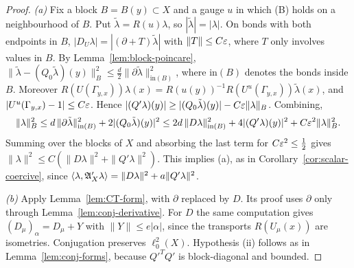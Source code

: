 \begin{proof}
\emph{(a)} Fix a block $B=B(y)\subset X$ and a gauge $u$ in which (B) holds on a neighbourhood of $B$. Put $\tilde\lambda=R(u)\lambda$, so $|\tilde\lambda|=|\lambda|$. On bonds with both endpoints in $B$, $|D_U\lambda|=|(\partial+T)\tilde\lambda|$ with $\|T\|\le C\varepsilon$, where $T$ only involves values in $B$. By Lemma~\ref{lem:block-poincare}, $\|\tilde\lambda-(Q_0\tilde\lambda)(y)\|_B^2\le\frac d2\|\partial\tilde\lambda\|^2_{\mathrm{in}(B)}$, where $\mathrm{in}(B)$ denotes the bonds inside $B$. Moreover $R(U(\Gamma_{y,x}))\lambda(x)=R(u(y))^{-1}R(U^u(\Gamma_{y,x}))\tilde\lambda(x)$, and $|U^u(\Gamma_{y,x})-1|\le C\varepsilon$. Hence $|(Q'\lambda)(y)|\ge|(Q_0\tilde\lambda)(y)|-C\varepsilon\|\lambda\|_B$. Combining,
\[
\|\lambda\|_B^2\le d\,\|\partial\tilde\lambda\|^2_{\mathrm{in}(B)}+2|(Q_0\tilde\lambda)(y)|^2\le2d\,\|D\lambda\|^2_{\mathrm{in}(B)}+4|(Q'\lambda)(y)|^2+C\varepsilon^2\|\lambda\|_B^2 .
\]
Summing over the blocks of $X$ and absorbing the last term for $C\varepsilon^2\le\frac12$ gives $\|\lambda\|^2\le C(\|D\lambda\|^2+\|Q'\lambda\|^2)$. This implies (a), as in Corollary~\ref{cor:scalar-coercive}, since $\langle \lambda,\mathfrak A'_X\lambda\rangle=\|D\lambda\|^2+a\|Q'\lambda\|^2$.

\emph{(b)} Apply Lemma~\ref{lem:CT-form}, with $\partial$ replaced by $D$. Its proof uses $\partial$ only through Lemma~\ref{lem:conj-derivative}. For $D$ the same computation gives $(D_\mu)_\alpha=D_\mu+Y$ with $\|Y\|\le e|\alpha|$, since the transports $R(U_\mu(x))$ are isometries. Conjugation preserves $\ell^2_0(X)$. Hypothesis (ii) follows as in Lemma~\ref{lem:conj-forms}, because $Q'^TQ'$ is block-diagonal and bounded.


\end{proof}

